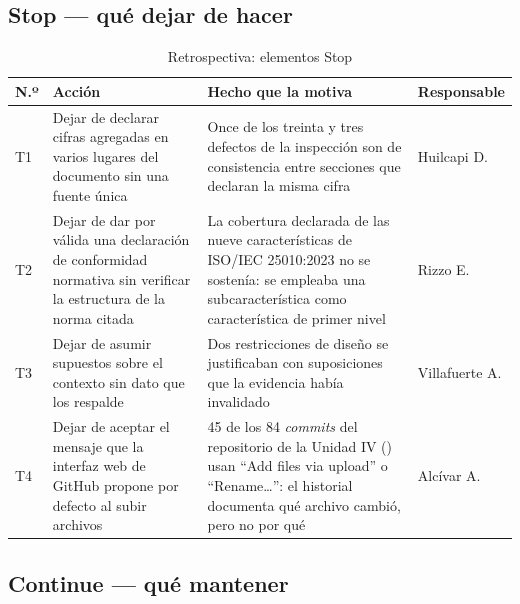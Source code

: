 \subsection{Stop --- qué dejar de hacer}

\begin{table}[H]
\centering\footnotesize
\caption{Retrospectiva: elementos Stop}
\label{tab:stop}
\begin{tabular}{|C{1.2cm}|L{6.4cm}|L{4.4cm}|C{2.4cm}|}
\hline
{}\textbf{N.º} & \textbf{Acción} & \textbf{Hecho que la motiva} & \textbf{Responsable}\\ \hline
T1 & Dejar de declarar cifras agregadas en varios lugares del documento sin una fuente única & Once de los treinta y tres defectos de la inspección son de consistencia entre secciones que declaran la misma cifra & Huilcapi D.\\ \hline
T2 & Dejar de dar por válida una declaración de conformidad normativa sin verificar la estructura de la norma citada & La cobertura declarada de las nueve características de ISO/IEC 25010:2023 no se sostenía: se empleaba una subcaracterística como característica de primer nivel & Rizzo E.\\ \hline
T3 & Dejar de asumir supuestos sobre el contexto sin dato que los respalde & Dos restricciones de diseño se justificaban con suposiciones que la evidencia  había invalidado & Villafuerte A.\\ \hline
T4 & Dejar de aceptar el mensaje que la interfaz web de GitHub propone por defecto al subir archivos & 45 de los 84 \emph{commits} del repositorio de la Unidad IV () usan ``Add files via upload'' o ``Rename\ldots'': el historial documenta qué archivo cambió, pero no por qué & Alcívar A.\\ \hline
\end{tabular}
\end{table}

\subsection{Continue --- qué mantener}

